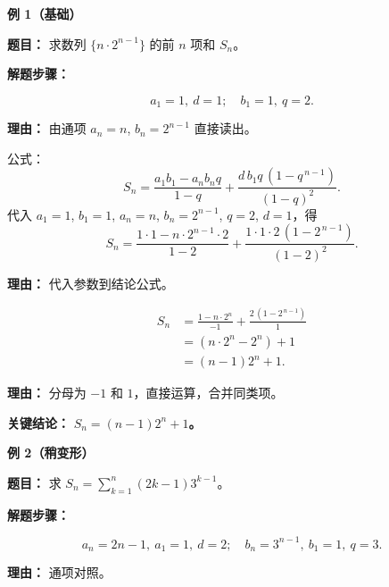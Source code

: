 \begin{examplebox}
	\textbf{\textcolor{CExample}{例 1（基础）}}

	\textbf{\textcolor{CExample}{题目：}}
	求数列 $\{n\cdot 2^{n-1}\}$ 的前 $n$ 项和 $S_n$。

	\textbf{\textcolor{CExample}{解题步骤：}}
	\begin{description}[style=nextline, leftmargin=2.8em, labelsep=0.5em, itemsep=0.45em]
		\item[\textbf{第一步（识别参数）：}]
			\[
				a_1 = 1,\ d = 1;\quad b_1 = 1,\ q = 2.
			\]
			\par\textbf{理由：} 由通项 $a_n = n$, $b_n = 2^{n-1}$ 直接读出。

		\item[\textbf{第二步（套用公式）：}]
			公式：
			\[
				S_n = \frac{a_1 b_1 - a_n b_n q}{1-q} + \frac{d\,b_1 q\,(1-q^{\,n-1})}{(1-q)^2}.
			\]
			代入 $a_1=1$, $b_1=1$, $a_n=n$, $b_n=2^{n-1}$, $q=2$, $d=1$，得
			\[
				S_n = \frac{1\cdot1 - n\cdot2^{n-1}\cdot2}{1-2} + \frac{1\cdot1\cdot2\,(1-2^{\,n-1})}{(1-2)^2}.
			\]
			\par\textbf{理由：} 代入参数到结论公式。

		\item[\textbf{第三步（化简求值）：}]
			\[
				\begin{aligned}
					S_n &= \frac{1 - n\cdot2^{n}}{-1} + \frac{2\,(1-2^{\,n-1})}{1} \\
					&= (n\cdot2^{n} - 2^{n}) + 1 \\
					&= (n-1)2^{n} + 1.
			\end{aligned}
			\]
			\par\textbf{理由：} 分母为 $-1$ 和 $1$，直接运算，合并同类项。
	\end{description}

	\textbf{\textcolor{CExample}{关键结论：}}
	\textbf{$S_n = (n-1)2^{n} + 1$。}

	\medskip
	\textbf{\textcolor{CExample}{例 2（稍变形）}}

	\textbf{\textcolor{CExample}{题目：}}
	求 $S_n = \sum_{k=1}^{n} (2k-1)3^{k-1}$。

	\textbf{\textcolor{CExample}{解题步骤：}}
	\begin{description}[style=nextline, leftmargin=2.8em, labelsep=0.5em, itemsep=0.45em]
		\item[\textbf{第一步（识别参数）：}]
			\[
				a_n = 2n-1,\ a_1 = 1,\ d = 2;\quad b_n = 3^{n-1},\ b_1 = 1,\ q = 3.
			\]
			\par\textbf{理由：} 通项对照。


\end{description}
\end{examplebox}
